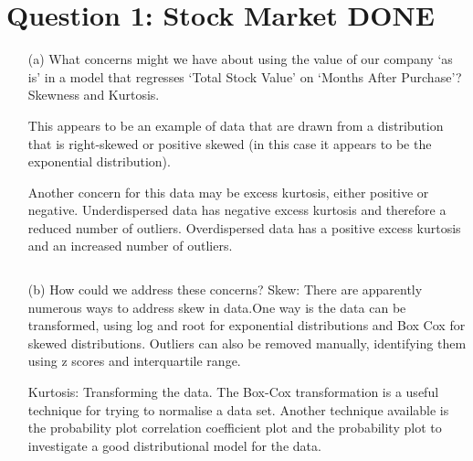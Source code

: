 \documentclass[12pt,letterpaper]{article}
\begin{document}
	\section*{Question 1: Stock Market DONE}
	\begin{enumerate}
		
		\item [(a)] What concerns might we have about using the value of our company ‘as is’ in a model that
		regresses 
		‘Total Stock Value’ on ‘Months After Purchase’?
		Skewness and Kurtosis. 
		
		This appears to be an example of data that are drawn from a distribution that is right-skewed or positive skewed (in this case it appears to be the exponential distribution). 
		
		
		Another concern for this data may be excess kurtosis, either positive or negative. Underdispersed data has negative excess kurtosis and therefore a reduced number of outliers. 
		Overdispersed data has a positive excess kurtosis and an increased number of outliers.
		
		\begin{verbatim}	
		\end{verbatim}
		
		\item [(b)]  How could we address these
		concerns?
		Skew: There are apparently numerous ways to address skew in data.One way is the data can be transformed, using log and root for exponential distributions and Box Cox for skewed distributions. Outliers can also be removed manually, identifying them using z scores and interquartile range.
		
	Kurtosis: Transforming the data. The Box-Cox transformation is a useful technique for trying to normalise a data set. Another technique available is the probability plot correlation coefficient plot and the probability plot to investigate a good distributional model for the data. 
	
	\end{enumerate}
	
	\newpage
	
\end{document}
